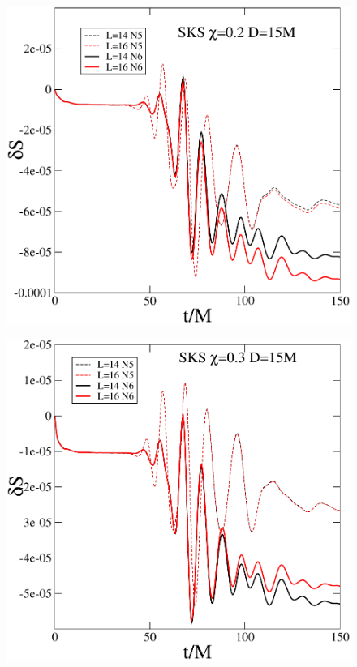 \begin{figure}
  \includegraphics[width=0.95\columnwidth]{chap5/dS_SKS_S2}
\end{figure}

\begin{figure}
  \includegraphics[width=0.95\columnwidth]{chap5/dS_SKS_S3}
\end{figure}

